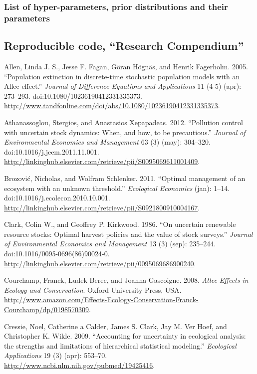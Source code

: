 \documentclass[author-year, review]{elsarticle} %
\begin{document}
\subsubsection{List of hyper-parameters, prior distributions and their
parameters}

\subsection{Reproducible code, ``Research Compendium''}

Allen, Linda J. S., Jesse F. Fagan, Göran Högnäs, and Henrik Fagerholm.
2005. ``Population extinction in discrete-time stochastic population
models with an Allee effect.'' \emph{Journal of Difference Equations and
Applications} 11 (4-5) (apr): 273--293.
doi:10.1080/10236190412331335373.
\url{http://www.tandfonline.com/doi/abs/10.1080/10236190412331335373}.

Athanassoglou, Stergios, and Anastasios Xepapadeas. 2012. ``Pollution
control with uncertain stock dynamics: When, and how, to be
precautious.'' \emph{Journal of Environmental Economics and Management}
63 (3) (may): 304--320. doi:10.1016/j.jeem.2011.11.001.
\url{http://linkinghub.elsevier.com/retrieve/pii/S0095069611001409}.

Brozović, Nicholas, and Wolfram Schlenker. 2011. ``Optimal management of
an ecosystem with an unknown threshold.'' \emph{Ecological Economics}
(jan): 1--14. doi:10.1016/j.ecolecon.2010.10.001.
\url{http://linkinghub.elsevier.com/retrieve/pii/S0921800910004167}.

Clark, Colin W., and Geoffrey P. Kirkwood. 1986. ``On uncertain
renewable resource stocks: Optimal harvest policies and the value of
stock surveys.'' \emph{Journal of Environmental Economics and
Management} 13 (3) (sep): 235--244. doi:10.1016/0095-0696(86)90024-0.
\url{http://linkinghub.elsevier.com/retrieve/pii/0095069686900240}.

Courchamp, Franck, Ludek Berec, and Joanna Gascoigne. 2008. \emph{Allee
Effects in Ecology and Conservation}. Oxford University Press, USA.
\url{http://www.amazon.com/Effects-Ecology-Conservation-Franck-Courchamp/dp/0198570309}.

Cressie, Noel, Catherine a Calder, James S. Clark, Jay M. Ver Hoef, and
Christopher K. Wikle. 2009. ``Accounting for uncertainty in ecological
analysis: the strengths and limitations of hierarchical statistical
modeling.'' \emph{Ecological Applications} 19 (3) (apr): 553--70.
\url{http://www.ncbi.nlm.nih.gov/pubmed/19425416}.
\end{document}
